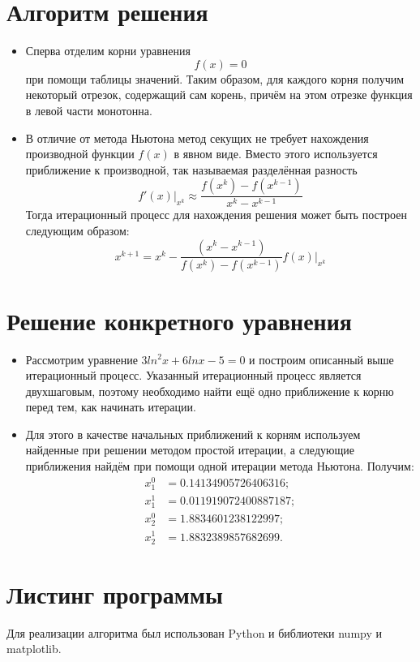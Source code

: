 \documentclass[14pt, a4paper]{article}
\begin{document}
  \section{Алгоритм решения}
  \begin{itemize}
    \item
    Сперва отделим корни уравнения \begin{equation}f(x) = 0\end{equation} при помощи таблицы значений. Таким образом, для каждого корня получим некоторый отрезок, содержащий сам корень, причём на этом отрезке функция в левой части монотонна.
    \item
    В отличие от метода Ньютона метод секущих не требует нахождения производной функции $f(x)$ в явном виде. Вместо этого используется приближение к производной, так называемая разделённая разность
    \begin{equation}f'(x)|_{x^k} \approx \frac{f(x^k) - f(x^{k-1})}{x^k - x^{k-1}}\end{equation}
    Тогда итерационный процесс для нахождения решения может быть построен следующим образом:
    \begin{equation}x^{k + 1} = x^k - \frac{(x^k - x^{k-1})}{f(x^k) - f(x^{k-1})}f(x)\big|_{x^k}\end{equation}
  \end{itemize}
  \section{Решение конкретного уравнения}
  \begin{itemize}
    \item
    Рассмотрим уравнение $3ln^2x + 6lnx - 5 = 0$ и построим описанный выше итерационный процесс. Указанный итерационный процесс является двухшаговым, поэтому необходимо найти ещё одно приближение к корню перед тем, как начинать итерации.
    \item
    Для этого в качестве начальных приближений к корням используем найденные при решении методом простой итерации, а следующие приближения найдём при помощи одной итерации метода Ньютона.
    Получим: \begin{align*}x_1^0 &= 0.14134905726406316; \\ x_1^1 &= 0.011919072400887187; \\ x_2^0 &= 1.8834601238122997; \\ x_2^1 &= 1.8832389857682699.\end{align*}
  \end{itemize}
  \section{Листинг программы}
  Для реализации алгоритма был использован Python и библиотеки numpy и matplotlib.
\end{document}
